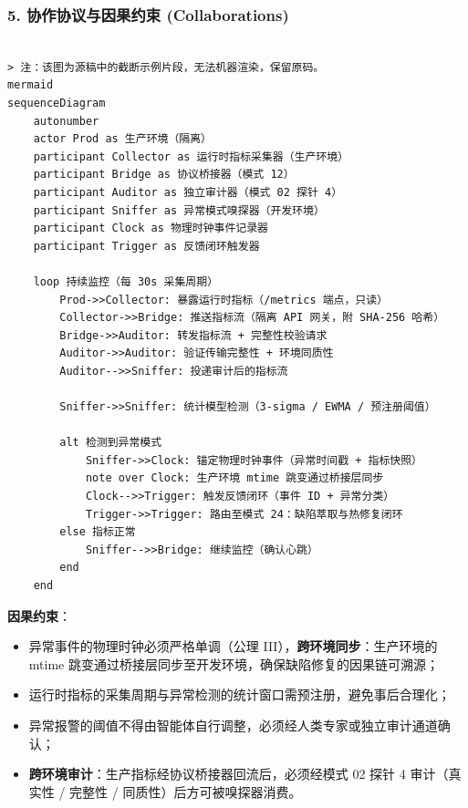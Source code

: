 \subsubsection{5. 协作协议与因果约束
(Collaborations)}\label{ux534fux4f5cux534fux8baeux4e0eux56e0ux679cux7ea6ux675f-collaborations-19}

\begin{verbatim}

> 注：该图为源稿中的截断示例片段，无法机器渲染，保留原码。
mermaid
sequenceDiagram
    autonumber
    actor Prod as 生产环境（隔离）
    participant Collector as 运行时指标采集器（生产环境）
    participant Bridge as 协议桥接器（模式 12）
    participant Auditor as 独立审计器（模式 02 探针 4）
    participant Sniffer as 异常模式嗅探器（开发环境）
    participant Clock as 物理时钟事件记录器
    participant Trigger as 反馈闭环触发器

    loop 持续监控（每 30s 采集周期）
        Prod->>Collector: 暴露运行时指标（/metrics 端点，只读）
        Collector->>Bridge: 推送指标流（隔离 API 网关，附 SHA-256 哈希）
        Bridge->>Auditor: 转发指标流 + 完整性校验请求
        Auditor->>Auditor: 验证传输完整性 + 环境同质性
        Auditor-->>Sniffer: 投递审计后的指标流
        
        Sniffer->>Sniffer: 统计模型检测（3-sigma / EWMA / 预注册阈值）
        
        alt 检测到异常模式
            Sniffer->>Clock: 锚定物理时钟事件（异常时间戳 + 指标快照）
            note over Clock: 生产环境 mtime 跳变通过桥接层同步
            Clock-->>Trigger: 触发反馈闭环（事件 ID + 异常分类）
            Trigger->>Trigger: 路由至模式 24：缺陷萃取与热修复闭环
        else 指标正常
            Sniffer-->>Bridge: 继续监控（确认心跳）
        end
    end
\end{verbatim}

\textbf{因果约束}：

\begin{itemize}
\item
  异常事件的物理时钟必须严格单调（公理
  III），\textbf{跨环境同步}：生产环境的 mtime
  跳变通过桥接层同步至开发环境，确保缺陷修复的因果链可溯源；
\item
  运行时指标的采集周期与异常检测的统计窗口需预注册，避免事后合理化；
\item
  异常报警的阈值不得由智能体自行调整，必须经人类专家或独立审计通道确认；
\item
  \textbf{跨环境审计}：生产指标经协议桥接器回流后，必须经模式 02 探针 4
  审计（真实性 / 完整性 / 同质性）后方可被嗅探器消费。
\end{itemize}

